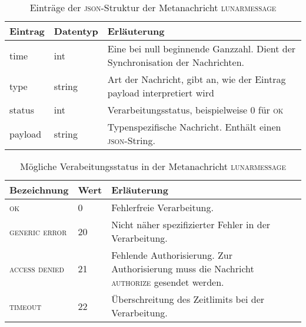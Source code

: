 \documentclass[english,11pt]{report}
\begin{document}
\begin{table}[]
\centering
\caption{Einträge der \textsc{json}-Struktur der Metanachricht \textsc{lunarmessage}}
\label{table-lunarmessage}
\begin{tabularx}{\textwidth}{l|l|X}
Eintrag & Datentyp & Erläuterung \\ \hline
time    & int    & Eine bei null beginnende Ganzzahl. Dient der Synchronisation der Nachrichten. \\
type    & string & Art der Nachricht, gibt an, wie der Eintrag payload interpretiert wird  \\
status  & int    & Verarbeitungsstatus, beispielweise 0 für \textsc{ok}                          \\
payload & string & Typenspezifische Nachricht. Enthält einen \textsc{json}-String.       
\end{tabularx}
\end{table}


\begin{table}[]
\centering
\caption{Mögliche Verabeitungsstatus in der Metanachricht \textsc{lunarmessage}}
\label{table-message-status}
\begin{tabularx}{\textwidth}{l|l|X}
Bezeichnung            & Wert & Erläuterung \\ \hline
\textsc{ok}            & 0    & Fehlerfreie Verarbeitung. \\
\textsc{generic error} & 20   & Nicht näher spezifizierter Fehler in der Verarbeitung.  \\
\textsc{access denied} & 21   & Fehlende Authorisierung. Zur Authorisierung muss die
                                Nachricht \textsc{authorize} gesendet werden. \\
\textsc{timeout}       & 22   & Überschreitung des Zeitlimits bei der Verarbeitung.
\end{tabularx}
\end{table}
\end{document}
